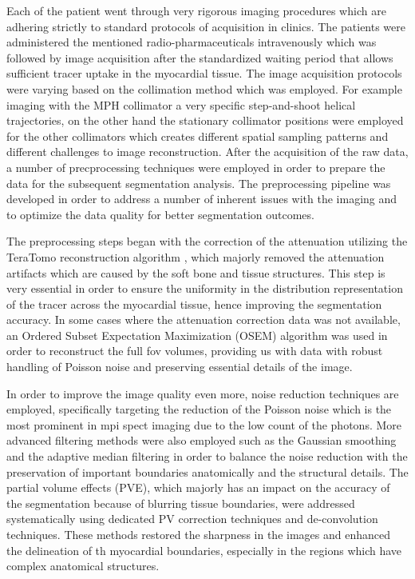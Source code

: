 Each of the patient went through very rigorous imaging procedures which are adhering strictly to standard protocols of acquisition in clinics. The patients were administered the mentioned radio-pharmaceuticals intravenously which was followed by image acquisition after the standardized waiting period that allows sufficient tracer uptake in the myocardial tissue. The image acquisition protocols were varying based on the collimation method which was employed. For example imaging with the MPH collimator a very specific step-and-shoot helical trajectories, on the other hand the stationary collimator positions were employed for the other collimators which creates different spatial sampling patterns and different challenges to image reconstruction. After the acquisition of the raw data, a number of precprocessing techniques were employed in order to prepare the data for the subsequent segmentation analysis. The preprocessing pipeline was developed in order to address a number of inherent issues with the imaging and to optimize the data quality for better segmentation outcomes.

The preprocessing steps began with the correction of the attenuation utilizing the TeraTomo reconstruction algorithm \cite{Nagy2013}, which majorly removed the attenuation artifacts which are caused by the soft bone and tissue structures. This step is very essential in order to ensure the uniformity in the distribution representation of the tracer across the myocardial tissue, hence improving the segmentation accuracy. In some cases where the attenuation correction data was not available, an Ordered Subset Expectation Maximization (OSEM) algorithm \cite{Hudson1994} was used in order to reconstruct the full \gls{fov} volumes, providing us with data with robust handling of Poisson noise and preserving essential details of the image. 

In order to improve the image quality even more, noise reduction techniques are employed, specifically targeting the reduction of the Poisson noise which is the most prominent in \gls{mpi} \gls{spect} imaging due to the low count of the photons. More advanced filtering methods were also employed such as the Gaussian smoothing and the adaptive median filtering in order to balance the noise reduction with the preservation of important boundaries anatomically and the structural details. The partial volume effects (PVE), which majorly has an impact on the accuracy of the segmentation because of blurring tissue boundaries, were addressed systematically using dedicated PV correction techniques and de-convolution techniques. These methods restored the sharpness in the images and enhanced the delineation of th myocardial boundaries, especially in the regions which have complex anatomical structures.

